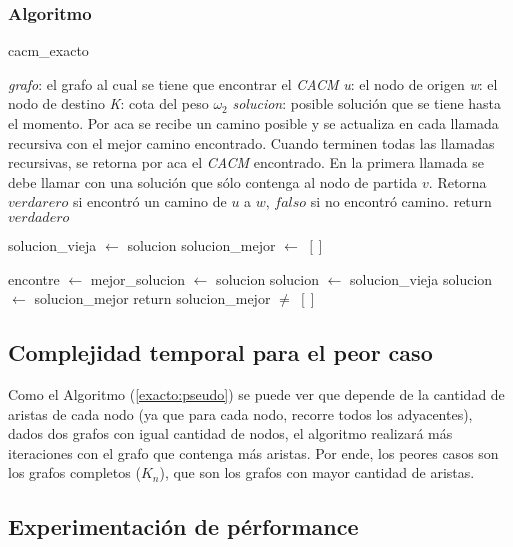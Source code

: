 \subsubsection{Algoritmo}

\begin{algorithm}[!h]
\caption{cacm\_exacto} \label{exacto:pseudo}
\end{algorithm}
\begin{algorithmic}[1]
	\Require \emph{grafo}: el grafo al cual se tiene que encontrar el \emph{CACM}
	\Require \emph{u}: el nodo de origen
	\Require \emph{w}: el nodo de destino
	\Require \emph{K}: cota del peso $\omega_2$
	\Require \emph{solucion}: posible soluci\'on que se tiene hasta el momento. Por aca se recibe un camino posible y se actualiza en cada llamada recursiva con el mejor camino encontrado. Cuando terminen todas las llamadas recursivas, se retorna por aca el \emph{CACM} encontrado. En la primera llamada se debe llamar con una soluci\'on que s\'olo contenga al nodo de partida $v$.
	\Statex
	\Ensure Retorna $verdarero$ si encontr\'o un camino de $u$ a $w$, $falso$ si no encontr\'o camino.
	\Statex
			\State return $verdadero$
		\EndIf
		
		\State solucion\_vieja $\gets$ solucion
		\State solucion\_mejor $\gets$ $[]$

				\State {}
				\State {}
				\State encontre $\gets$ 
					\State mejor\_solucion $\gets$ solucion
				\EndIf
				\State {}
				\State solucion $\gets$ solucion\_vieja
			\EndIf
		\EndFor
			\State solucion $\gets$ solucion\_mejor
		\EndIf
		\State return solucion\_mejor $\neq$ $[]$
	\EndProcedure
\end{algorithmic}

\subsection{Complejidad temporal para el peor caso} \label{exacto:complejidad}

Como el Algoritmo (\ref{exacto:pseudo}) se puede ver que depende de la cantidad de aristas de cada nodo (ya que para cada nodo, recorre todos los adyacentes), dados dos grafos
con igual cantidad de nodos, el algoritmo realizar\'a m\'as iteraciones con el grafo que contenga m\'as aristas. Por ende, los peores casos son los grafos completos ($K_n$),
que son los grafos con mayor cantidad de aristas.

\subsection{Experimentaci\'on de p\'erformance} \label{exacto:experimentacion}

